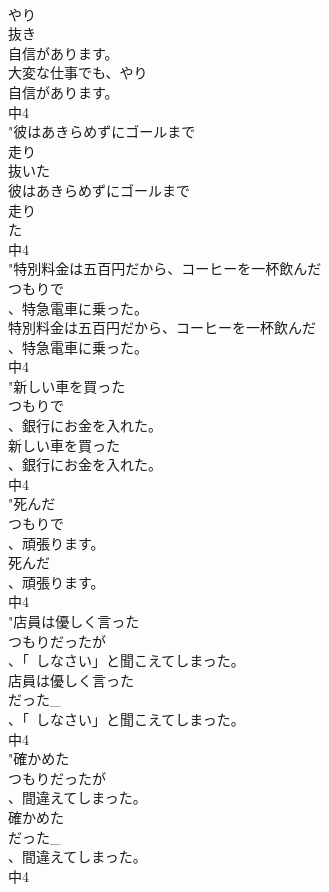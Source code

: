 \documentclass[8pt]{extreport}
\begin{document}
\begin{CJK}{UTF8}{min}
\\	やり
\\	抜き
\\	自信があります。
\\	大変な仕事でも、やり
\\	自信があります。
\\	中4
\\	"彼はあきらめずにゴールまで
\\	走り
\\	抜いた
\\	彼はあきらめずにゴールまで
\\	走り
\\	た
\\	中4
\\	"特別料金は五百円だから、コーヒーを一杯飲んだ
\\	つもりで
\\	、特急電車に乗った。
\\	特別料金は五百円だから、コーヒーを一杯飲んだ
\\	、特急電車に乗った。
\\	中4
\\	"新しい車を買った
\\	つもりで
\\	、銀行にお金を入れた。
\\	新しい車を買った
\\	、銀行にお金を入れた。
\\	中4
\\	"死んだ
\\	つもりで
\\	、頑張ります。
\\	死んだ
\\	、頑張ります。
\\	中4
\\	"店員は優しく言った
\\	つもりだったが
\\	、「~しなさい」と聞こえてしまった。
\\	店員は優しく言った
\\	だった_
\\	、「~しなさい」と聞こえてしまった。
\\	中4
\\	"確かめた
\\	つもりだったが
\\	、間違えてしまった。
\\	確かめた
\\	だった_
\\	、間違えてしまった。
\\	中4

\end{CJK}
\end{document}
